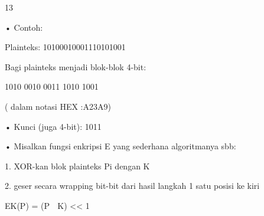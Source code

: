 \documentclass{article}
\begin{document}

13

• Contoh:

          Plainteks: 10100010001110101001

     Bagi plainteks menjadi blok-blok 4-bit:


1010  0010  0011  1010  1001

     ( dalam notasi HEX :A23A9)

• Kunci (juga 4-bit): 1011 

• Misalkan fungsi enkripsi E yang sederhana  algoritmanya sbb:

   1.  XOR-kan blok plainteks Pi dengan K 

   2.  geser secara wrapping bit-bit dari hasil langkah 1 satu posisi ke kiri


EK(P) = (P  K) << 1
\end{document}
